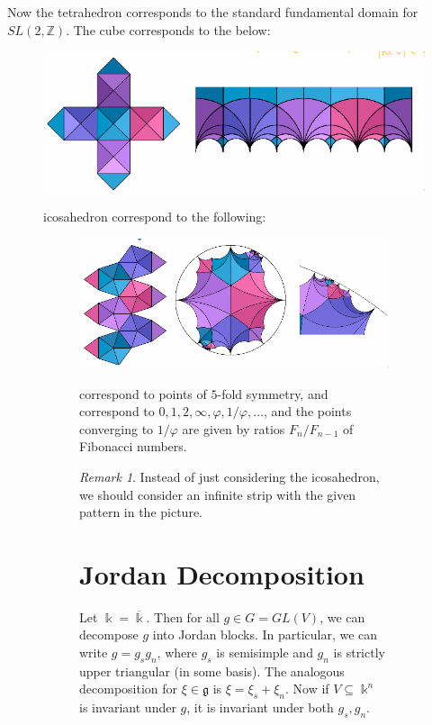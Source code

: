\documentclass[leqno, openany]{memoir}
\theoremstyle{definition}
\theoremstyle{remark}
\newtheorem{rmk}[thm]{Remark}
\theoremstyle{plain}
\theoremstyle{definition}
\theoremstyle{remark}
\newcommand{\Z}{\mathbb{Z}}
\renewcommand{\k}{\Bbbk}
\newcommand{\mf}[1]{\mathfrak{#1}}
\newcommand{\ol}[1]{\overline{#1}}
\begin{document}
Now the tetrahedron corresponds to the standard fundamental domain for $SL(2,
\Z)$. The cube corresponds to the below: \begin{figure}[H] \centering
    \includegraphics[width=0.8\linewidth]{squarefd} \caption{Fundamental domain
    subdivided}%
    icosahedron correspond to the following: \begin{figure}[H] \centering
        \includegraphics[width=0.8\linewidth]{icosafd} \caption{Fundamental
        domain for icosahedron}%
        correspond to points of $5$-fold symmetry, and correspond to $0, 1, 2,
        \infty, \varphi, 1/\varphi, \ldots$, and the points converging to
        $1/\varphi$ are given by ratios $F_n/F_{n-1}$ of Fibonacci numbers.

\begin{rmk} Instead of just considering the icosahedron, we should consider an
infinite strip with the given pattern in the picture.  \end{rmk}

\section{Jordan Decomposition}%

Let $\k = \ol{\k}$. Then for all $g \in G = GL(V)$, we can decompose $g$ into
Jordan blocks. In particular, we can write $g = g_s g_n$, where $g_s$ is
semisimple and $g_n$ is strictly upper triangular (in some basis). The
analogous decomposition for $\xi \in \mf{g}$ is $\xi = \xi_s + \xi_n$. Now if
$V \subseteq \k^n$ is invariant under $g$, it is invariant under both $g_s,
g_n$.


\end{figure}
\end{figure}
\end{document}
